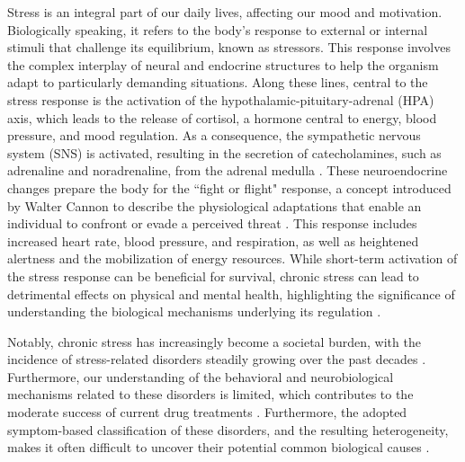 Stress is an integral part of our daily lives, affecting our mood and motivation. Biologically speaking, it refers to the body's response to external or internal stimuli that challenge its equilibrium, known as stressors. This response involves the complex interplay of neural and endocrine structures to help the organism adapt to particularly demanding situations. Along these lines, central to the stress response is the activation of the hypothalamic-pituitary-adrenal (HPA) axis, which leads to the release of cortisol, a hormone central to energy, blood pressure, and mood regulation. As a consequence, the sympathetic nervous system (SNS) is activated, resulting in the secretion of catecholamines, such as adrenaline and noradrenaline, from the adrenal medulla \cite{Godoy2018AImplications}. These neuroendocrine changes prepare the body for the ``fight or flight" response, a concept introduced by Walter Cannon to describe the physiological adaptations that enable an individual to confront or evade a perceived threat \cite{Cannon1953BodilyExcitement.}. This response includes increased heart rate, blood pressure, and respiration, as well as heightened alertness and the mobilization of energy resources. While short-term activation of the stress response can be beneficial for survival, chronic stress can lead to detrimental effects on physical and mental health, highlighting the significance of understanding the biological mechanisms underlying its regulation \cite{Davis2017NeurobiologyStudies}.

Notably, chronic stress has increasingly become a societal burden, with the incidence of stress-related disorders steadily growing over the past decades \cite{WorldHealthOrganization2021DepressionEstimates}. Furthermore, our understanding of the behavioral and neurobiological mechanisms related to these disorders is limited, which contributes to the moderate success of current drug treatments \cite{Shemesh2023ANeuroethology}. Furthermore, the adopted symptom-based classification of these disorders, and the resulting heterogeneity, makes it often difficult to uncover their potential common biological causes \cite{Crocq2015ADSM, Miranda2021SystematicSubtyping}.

